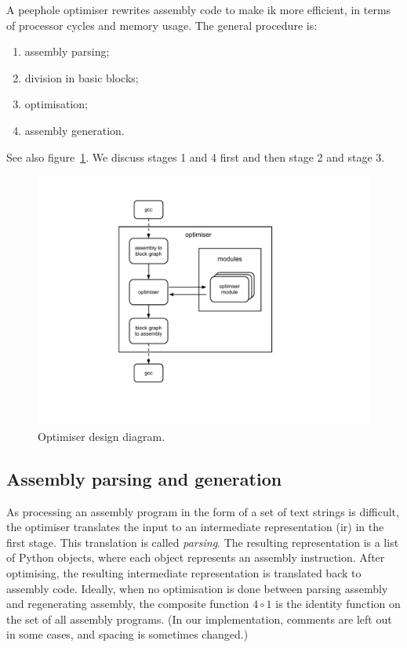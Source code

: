 A peephole optimiser rewrites assembly code to make ik more efficient, in terms of processor cycles and memory usage. The general procedure is:
\begin{enumerate}
\item assembly parsing;
\item division in basic blocks;
\item optimisation;
\item assembly generation.
\end{enumerate}
See also figure~\ref{fig:diagram}. We discuss stages 1 and 4 first and then stage 2 and stage 3.

\begin{figure}[h!]
\centering
\includegraphics[viewport= 170 90 510 490, clip=true]{diagram}
\caption{Optimiser design diagram.}
\label{fig:diagram}
\end{figure}


\subsection*{Assembly parsing and generation}
As processing an assembly program in the form of a set of text strings is difficult, the optimiser translates the input to an intermediate representation (ir) in the first stage. This translation is called \emph{parsing}. The resulting representation is a list of Python objects, where each object represents an assembly instruction. After optimising, the resulting intermediate representation is translated back to assembly code. Ideally, when no optimisation is done between parsing assembly and regenerating assembly, the composite function $4\circ 1$ is the identity function on the set of all assembly programs. (In our implementation, comments are left out in some cases, and spacing is sometimes changed.)

